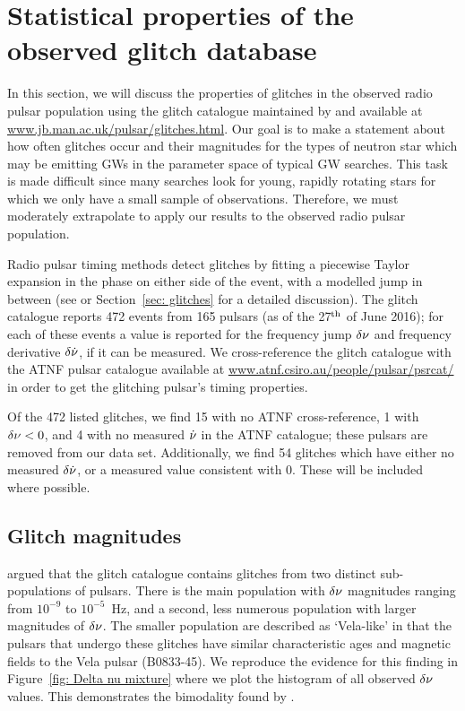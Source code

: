 \documentclass[../full_thesis/full_thesis.tex]{subfiles}
\begin{document}
\section{Statistical properties of the observed glitch database}
\label{sec: statistical properties}
In this section, we will discuss the properties of glitches in the observed
radio pulsar population using the glitch catalogue maintained by \citet{Espinoza2011}
and available at \url{www.jb.man.ac.uk/pulsar/glitches.html}.
Our goal is to make a statement about how often glitches occur and their
magnitudes for the types of neutron star which may be emitting GWs in the
parameter space of typical GW searches.  This task is made difficult since many
searches look for young, rapidly rotating stars for which we only have a small
sample of observations. Therefore, we must moderately extrapolate to apply our
results to the observed radio pulsar population.

Radio pulsar timing methods detect glitches by fitting a piecewise Taylor
expansion in the phase on either side of the event, with a modelled jump in
between (see \citet{Edwards2006} or Section~\ref{sec: glitches} for a detailed
discussion). The glitch catalogue reports 472 events from
165 pulsars (as of the 27$^{\rm th}$ of June 2016); for each of these events a
value is reported for the frequency jump $\delta\nu$ and frequency derivative
$\delta\dot{\nu}$, if it can be measured. We cross-reference the glitch
catalogue with the ATNF \citet{ATNF} pulsar catalogue available at
\url{www.atnf.csiro.au/people/pulsar/psrcat/} in order to get the glitching
pulsar's timing properties.

Of the 472 listed glitches, we find 15 with no ATNF cross-reference, 1 with
$\delta\nu < 0$, and 4 with no measured $\dot{\nu}$ in the ATNF catalogue; these
pulsars are removed from our data set. Additionally, we find 54 glitches which
have either no measured $\delta\dot{\nu}$, or a measured value consistent with 0.
These will be included where possible.

\subsection{Glitch magnitudes}
\label{sec: observed glitch magnitude}

\citet{Espinoza2011} argued that the glitch catalogue contains glitches from
two distinct sub-populations of pulsars. There is the main population with
$\delta\nu$ magnitudes ranging from $10^{-9}$ to $10^{-5}$~Hz, and a second,
less numerous population with larger magnitudes of $\delta\nu$. The smaller
population are described as `Vela-like' in that the pulsars that undergo these
glitches have similar
characteristic ages and magnetic fields to the Vela pulsar (B0833-45).  We reproduce the evidence for this finding in
Figure~\ref{fig: Delta nu mixture} where we plot the histogram of all observed
$\delta\nu$ values. This demonstrates the bimodality found by \citet{Espinoza2011}.
\end{document}
